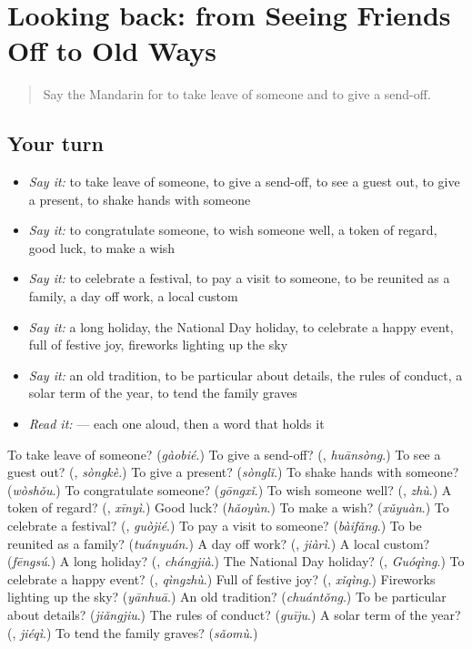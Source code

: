 \section[(dialogue)]{Looking back: from Seeing Friends Off to Old Ways}

\label{lesson:ZH-R340-review-336-340}



\begin{quote}
Say the Mandarin for to take leave of someone and to give a send-off.
\end{quote}

\subsection*{Your turn}
\begin{itemize}
\raggedright
  \item \emph{Say it:} to take leave of someone, to give a send-off, to see a guest out, to give a present, to shake hands with someone
  \item \emph{Say it:} to congratulate someone, to wish someone well, a token of regard, good luck, to make a wish
  \item \emph{Say it:} to celebrate a festival, to pay a visit to someone, to be reunited as a family, a day off work, a local custom
  \item \emph{Say it:} a long holiday, the National Day holiday, to celebrate a happy event, full of festive joy, fireworks lighting up the sky
  \item \emph{Say it:} an old tradition, to be particular about details, the rules of conduct, a solar term of the year, to tend the family graves
  \item \emph{Read it:}    — each one aloud, then a word that holds it
\end{itemize}

\begin{tcolorbox}[breakable,colback=teal!4,colframe=teal!35!black,title={Before you move on}]
To take leave of someone? (\emph{gàobié}.) To give a send-off? (\textbf{}, \emph{huānsòng}.) To see a guest out? (\textbf{}, \emph{sòngkè}.) To give a present? (\emph{sònglǐ}.) To shake hands with someone? (\emph{wòshǒu}.) To congratulate someone? (\emph{gōngxǐ}.) To wish someone well? (\textbf{}, \emph{zhù}.) A token of regard? (\textbf{}, \emph{xīnyì}.) Good luck? (\emph{hǎoyùn}.) To make a wish? (\emph{xǔyuàn}.) To celebrate a festival? (\textbf{}, \emph{guòjié}.) To pay a visit to someone? (\emph{bàifǎng}.) To be reunited as a family? (\emph{tuányuán}.) A day off work? (\textbf{}, \emph{jiàrì}.) A local custom? (\emph{fēngsú}.) A long holiday? (\textbf{}, \emph{chángjià}.) The National Day holiday? (\textbf{}, \emph{Guóqìng}.) To celebrate a happy event? (\textbf{}, \emph{qìngzhù}.) Full of festive joy? (\textbf{}, \emph{xǐqìng}.) Fireworks lighting up the sky? (\emph{yānhuā}.) An old tradition? (\emph{chuántǒng}.) To be particular about details? (\emph{jiǎngjiu}.) The rules of conduct? (\emph{guīju}.) A solar term of the year? (\textbf{}, \emph{jiéqì}.) To tend the family graves? (\emph{sǎomù}.)
\end{tcolorbox}

